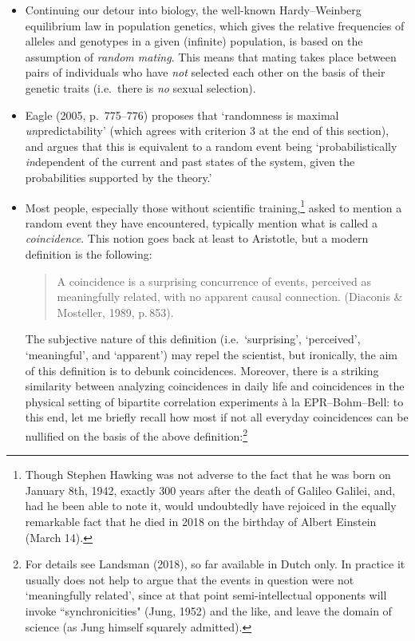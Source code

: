 \documentclass[11pt,a4paper]{article}
\numberwithin{equation}{section}
\begin{document}
\begin{itemize}
 \item Continuing our detour into biology,  the well-known Hardy--Weinberg equilibrium law in population genetics, which gives  the relative frequencies of alleles and genotypes in a given (infinite) population, is based on the assumption of \emph{random mating}. This means that mating takes place between pairs of individuals who have \emph{not} selected each other on the basis of their genetic traits (i.e.\ there is \emph{no} sexual selection).
 \item Eagle (2005, p.\ 775--776) proposes that `randomness is maximal \emph{un}predictability' (which agrees with criterion 3 at the end of this section), and argues that this is equivalent to 
a random event being `probabilistically \emph{in}dependent of the current and past states of the system, given the probabilities
supported by the theory.' 
 \item Most people, especially those without scientific training,\footnote{Though Stephen Hawking was not adverse to the fact that he was born on January 8th, 1942, exactly 300 years after the death of Galileo Galilei, and, had he been able to note it, would undoubtedly have rejoiced in the equally remarkable fact that he died in 2018 on the birthday of Albert Einstein
(March 14).}
  asked to mention a random event they have encountered, typically mention what is called a \emph{coincidence}. 
  This notion goes back at least to Aristotle, but a modern definition is the following:
  \begin{quote}\begin{small}
  A coincidence is a surprising concurrence of events, perceived as meaningfully related, with no apparent causal connection. (Diaconis \& Mosteller, 1989,  p.\,853).\end{small}\end{quote}
The subjective nature of this definition (i.e.\ `surprising', `perceived', `meaningful', and `apparent') may  repel the scientist, but ironically, the aim of this definition is to debunk coincidences. Moreover, there is a striking similarity between analyzing
 coincidences in daily life and coincidences in the physical setting of bipartite correlation experiments \`{a} la EPR--Bohm--Bell: to this end, let me briefly recall how most if not all everyday coincidences can be nullified on the basis of the above definition:\footnote{For details see Landsman (2018), so far available in Dutch only. In practice it usually does not help to argue that the events in question were not `meaningfully related', since at that point  semi-intellectual opponents will invoke ``synchronicities" (Jung, 1952) and the like, and leave the domain of science (as Jung himself squarely admitted). 
}
\end{itemize}
\end{document}
